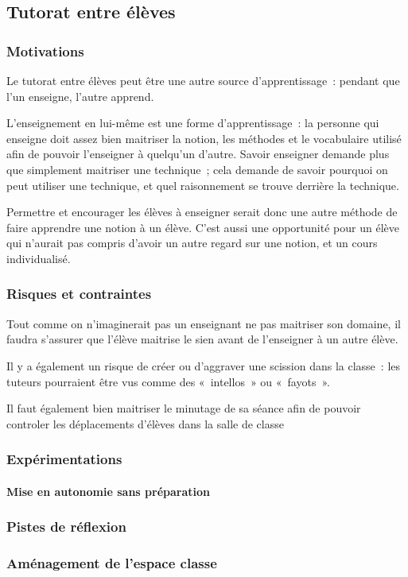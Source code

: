 \subsection{Tutorat entre élèves}
\subsubsection{Motivations}
Le tutorat entre élèves peut être une autre source d'apprentissage : pendant que
l'un enseigne, l'autre apprend.

L'enseignement en lui-même est une forme d'apprentissage : la personne qui
enseigne doit assez bien maitriser la notion, les méthodes et le vocabulaire
utilisé afin de pouvoir l'enseigner à quelqu'un d'autre. Savoir enseigner
demande plus que simplement maitriser une technique ; cela demande de savoir
pourquoi on peut utiliser une technique, et quel raisonnement se trouve derrière
la technique.

Permettre et encourager les élèves à enseigner serait donc une autre méthode de
faire apprendre une notion à un élève. C'est aussi une opportunité pour un élève
qui n'aurait pas compris d'avoir un autre regard sur une notion, et un cours
individualisé.


\subsubsection{Risques et contraintes}
Tout comme on n'imaginerait pas un enseignant ne pas maitriser son domaine, il
faudra s'assurer que l'élève maitrise le sien avant de l'enseigner à un autre
élève.

Il y a également un risque de créer ou d'aggraver une scission dans la classe :
les tuteurs pourraient être vus comme des « intellos » ou « fayots ».


Il faut également bien maitriser le minutage de sa séance afin de pouvoir controler
les déplacements d'élèves dans la salle de classe

\subsubsection{Expérimentations}

\paragraph{Mise en autonomie sans préparation}

\subsubsection{Pistes de réflexion}

\subsubsection{Aménagement de l'espace classe}


